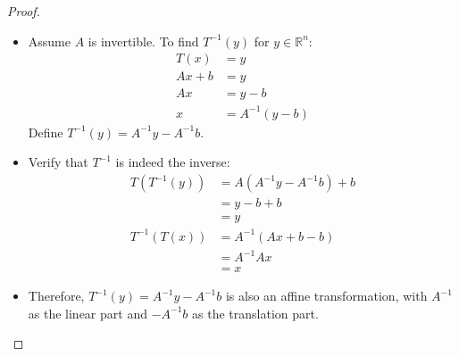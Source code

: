 \documentclass[12pt]{amsart}
\theoremstyle{definition}
\numberwithin{equation}{section}
\begin{document}
\begin{exercise}{3}
\begin{enumerate}[label=\alph*.]
\begin{proof}
                
                \begin{itemize}[label=--]
                    \item Assume \(A\) is invertible. To find \(T^{-1}(y)\) for \(y \in \mathbb{R}^n\):
                    \begin{align*}
                    T(x) &= y \\
                    Ax + b &= y \\
                    Ax &= y - b \\
                    x &= A^{-1}(y - b)
                    \end{align*}
                    Define \(T^{-1}(y) = A^{-1}y - A^{-1}b\).
                    \item Verify that \(T^{-1}\) is indeed the inverse:
                    \begin{align*}
                    T(T^{-1}(y)) &= A(A^{-1}y - A^{-1}b) + b \\
                    &= y - b + b \\
                    &= y \\
                    T^{-1}(T(x)) &= A^{-1}(Ax + b - b) \\
                    &= A^{-1}Ax \\
                    &= x
                    \end{align*}
                    \item Therefore, \(T^{-1}(y) = A^{-1}y - A^{-1}b\) is also an affine transformation, with \(A^{-1}\) as the linear part and \(-A^{-1}b\) as the translation part.
                \end{itemize}
            \end{proof}
        \end{enumerate}
        \end{exercise}
        \newpage
\end{document}
